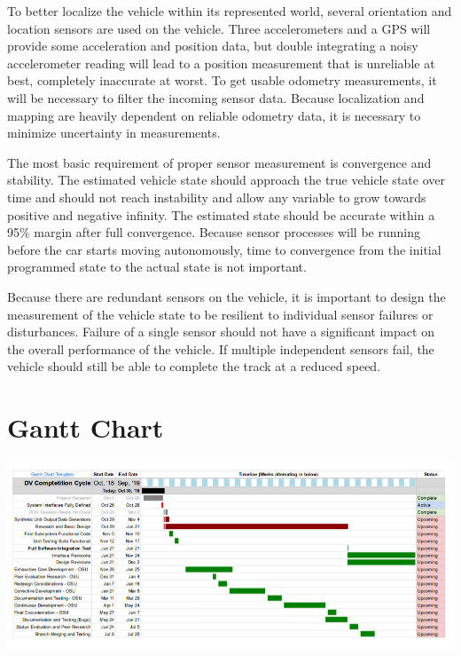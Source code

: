 \documentclass[10pt, onecolumn, draftclsnofoot, letterpaper,compsoc]{IEEEtran}
\begin{document}
To better localize the vehicle within its represented world, several orientation and location sensors are used on the vehicle. Three accelerometers and a GPS will provide some acceleration and position data, but double integrating a noisy accelerometer reading will lead to a position measurement that is unreliable at best, completely inaccurate at worst. To get usable odometry measurements, it will be necessary to filter the incoming sensor data. Because localization and mapping are heavily dependent on reliable odometry data, it is necessary to minimize uncertainty in measurements. 

The most basic requirement of proper sensor measurement is convergence and stability. The estimated vehicle state should approach the true vehicle state over time and should not reach instability and allow any variable to grow towards positive and negative infinity. The estimated state should be accurate within a 95\% margin
after full convergence. Because sensor processes will be running before the car starts moving autonomously, time to convergence from the initial programmed state to the actual state is not important. 

Because there are redundant sensors on the vehicle, it is important to design the measurement of the vehicle state to be resilient to individual sensor failures or disturbances. Failure of a single sensor should not have a significant impact on the overall performance of the vehicle. If multiple independent sensors fail, the vehicle should still be able to complete the track at a reduced speed.

\section{Gantt Chart}

\begin{center}
\includegraphics[scale=0.5]{GanttChart_v1.png}
\end{center}
\end{document}
